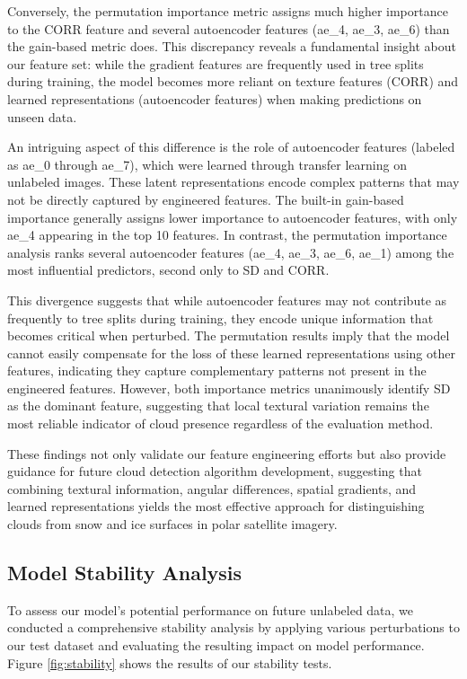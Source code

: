 \documentclass[10pt,letterpaper]{article}
\begin{document}
Conversely, the permutation importance metric assigns much higher importance to the CORR feature and several autoencoder features (ae\_4, ae\_3, ae\_6) than the gain-based metric does. This discrepancy reveals a fundamental insight about our feature set: while the gradient features are frequently used in tree splits during training, the model becomes more reliant on texture features (CORR) and learned representations (autoencoder features) when making predictions on unseen data.

An intriguing aspect of this difference is the role of autoencoder features (labeled as ae\_0 through ae\_7), which were learned through transfer learning on unlabeled images. These latent representations encode complex patterns that may not be directly captured by engineered features. The built-in gain-based importance generally assigns lower importance to autoencoder features, with only ae\_4 appearing in the top 10 features. In contrast, the permutation importance analysis ranks several autoencoder features (ae\_4, ae\_3, ae\_6, ae\_1) among the most influential predictors, second only to SD and CORR.

This divergence suggests that while autoencoder features may not contribute as frequently to tree splits during training, they encode unique information that becomes critical when perturbed. The permutation results imply that the model cannot easily compensate for the loss of these learned representations using other features, indicating they capture complementary patterns not present in the engineered features. However, both importance metrics unanimously identify SD as the dominant feature, suggesting that local textural variation remains the most reliable indicator of cloud presence regardless of the evaluation method.

These findings not only validate our feature engineering efforts but also provide guidance for future cloud detection algorithm development, suggesting that combining textural information, angular differences, spatial gradients, and learned representations yields the most effective approach for distinguishing clouds from snow and ice surfaces in polar satellite imagery.

\subsection{Model Stability Analysis}

To assess our model's potential performance on future unlabeled data, we conducted a comprehensive stability analysis by applying various perturbations to our test dataset and evaluating the resulting impact on model performance. Figure \ref{fig:stability} shows the results of our stability tests.
\end{document}
